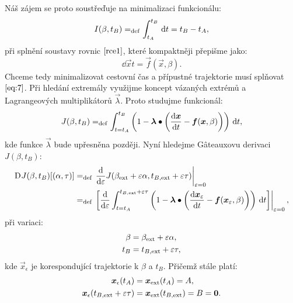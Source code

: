 \documentclass[reqno, a4paper]{amsart}
\numberwithin{equation}{section}
\begin{document}
Náš zájem se proto soustřeďuje na minimalizaci funkcionálu:
\begin{equation}
  \label{eq:8}
  I(\beta, t_{B}) =_{\mathrm{def}} \int_{t_{A}}^{t_{B}}\, \mathrm{d} t = t_{B} - t_{A},
\end{equation}
při splnění soustavy rovnic $\eqref{rce1}$, které kompaktněji přepišme jako:
\begin{equation}
  \label{eq:7}
  \dd{\vec{x}}{t} = \vec{f}(\vec{x}, \beta).
\end{equation}
Chceme tedy minimalizovat cestovní čas a přípustné trajektorie musí splňovat $\eqref{eq:7}$. Při hledání extremály využijme koncept vázaných extrémů a Lagrangeových multiplikátorů $\vec{\lambda}$. Proto studujme funkcionál:
\begin{equation}
  \label{eq:9}
  J(\beta, t_{B}) =_{\mathrm{def}}
  \int_{t = t_{A}}^{t_{B}}
  \left(
    1
    -
    \bm{\lambda} \bullet \left(\frac{\mathrm{d} {\bm{x}}}{\mathrm{d} {t}} - \bm{f}(\bm{x}, \beta) \right)
  \right)
  \, \mathrm{d} t,
\end{equation}
kde funkce $\vec{\lambda}$ bude upřesněna později. Nyní hledejme G\^{a}teauxovu derivaci $J(\beta, t_{B})$:
\begin{equation}
\begin{split}
  \label{eq:13}
  \mathrm{D}_{} J(\beta, t_{B}) [(\alpha, \tau)]
  & =
  _{\mathrm{def}}
  \left.
    \frac{\mathrm{d} {}}{\mathrm{d} {\varepsilon}}
    J(\beta_{\mathrm{ext}} + \varepsilon \alpha, t_{B, \mathrm{ext}} + \varepsilon \tau)
  \right|_{\varepsilon = 0}  \\
  & =
  _{\mathrm{def}}
  \left.
    \left[
      \frac{\mathrm{d} {}}{\mathrm{d} {\varepsilon}}
      \int_{t = t_{A}}^{t_{B, \mathrm{ext}} + \varepsilon \tau}
      \left(
        1
        -
        \bm{\lambda} \bullet \left(\frac{\mathrm{d} {\bm{x}_{\varepsilon}}}{\mathrm{d} {t}} - \bm{f}(\bm{x}_{\varepsilon}, \beta) \right)
      \right)
      \, \mathrm{d} t
    \right]
  \right|_{\varepsilon = 0}
  ,
\end{split}
\end{equation}
při variaci:
\begin{subequations}
  \label{eq:10}
  \begin{align}
    \label{eq:11}
    \beta &= \beta_{\mathrm{ext}} + \varepsilon \alpha, \\
    \label{eq:12}
    t_{B} &= t_{B, \mathrm{ext}} + \varepsilon \tau,
  \end{align}
\end{subequations}
kde $\vec{x}_{\epsilon}$ je korespondující trajektorie k $\beta$ a $t_{B}$. Přičemž stále platí:
\begin{subequations}
  \label{eq:010}
  \begin{align}
    \label{eq:020}
    \bm{x}_{\epsilon}(t_{A})& = \bm{x}_{\mathrm{ext}}(t_{A})=A, \\
    \label{eq:030}
    \bm{x}_{\epsilon}(t_{B, \mathrm{ext}} + \varepsilon \tau) & =\bm{x}_{\mathrm{ext}}(t_{B, \mathrm{ext}})= B = \bm{0}.
  \end{align}
\end{subequations}
\end{document}

